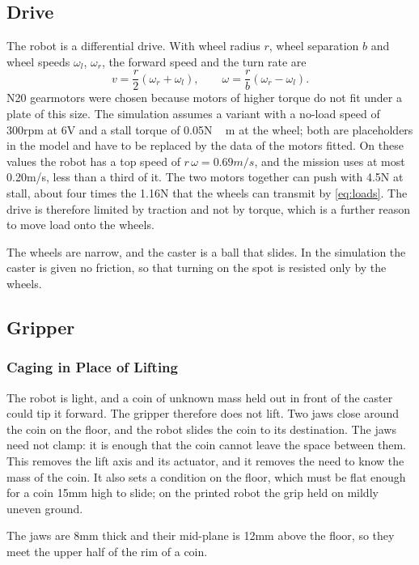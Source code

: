 \subsection{Drive}
\label{sec:drive}
The robot is a differential drive. With wheel radius $r$, wheel separation $b$ and wheel
speeds $\omega_l$, $\omega_r$, the forward speed and the turn rate are
\begin{equation}
  v = \frac{r}{2}(\omega_r+\omega_l), \qquad \omega = \frac{r}{b}(\omega_r-\omega_l).
  \label{eq:diffdrive}
\end{equation}
N20 gearmotors were chosen because motors of higher torque do not fit under a plate of this
size. The simulation assumes a variant with a no-load speed of 300\unit{rpm} at
6\unit{V} and a stall torque of 0.05\unit{N\,m} at the wheel; both are placeholders in the
model and have to be replaced by the data of the motors fitted. On these values the robot
has a top speed of $r\,\omega=0.69\unit{m/s}$, and the mission uses at most
0.20\unit{m/s}, less than a third of it. The two motors together can push with
4.5\unit{N} at stall, about four times the 1.16\unit{N} that the wheels can transmit by
\cref{eq:loads}. The drive is therefore limited by traction and not by torque, which is a
further reason to move load onto the wheels.

The wheels are narrow, and the caster is a ball that slides. In the simulation the caster
is given no friction, so that turning on the spot is resisted only by the wheels.

\subsection{Gripper}
\label{sec:gripper}
\subsubsection{Caging in Place of Lifting}
The robot is light, and a coin of unknown mass held out in front of the caster could tip it
forward. The gripper therefore does not lift. Two jaws close around the coin on the floor,
and the robot slides the coin to its destination. The jaws need not clamp: it is enough that
the coin cannot leave the space between them. This removes the lift axis and its actuator,
and it removes the need to know the mass of the coin. It also sets a condition on the floor,
which must be flat enough for a coin 15\unit{mm} high to slide; on the printed robot the
grip held on mildly uneven ground.

The jaws are 8\unit{mm} thick and their mid-plane is 12\unit{mm} above the floor, so they
meet the upper half of the rim of a coin.


